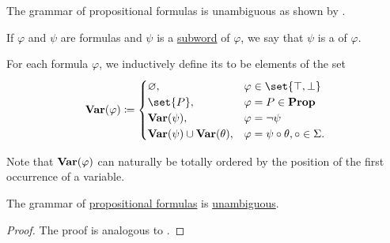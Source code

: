 \begin{definition}
\begin{thmenum}
    The grammar of propositional formulas is unambiguous as shown by .

     If \( \varphi \) and \( \psi \) are formulas and \( \psi \) is a \hyperref[def:language/subword]{subword} of \( \varphi \), we say that \( \psi \) is a  of \( \varphi \).

     For each formula \( \varphi \), we inductively define its  to be elements of the set
    \begin{equation}\label{eq:def:propositional_syntax/varables}
      \boldop{Var}(\varphi) \coloneqq \begin{cases}
        \varnothing,                                  &\varphi \in \set{ \top, \bot } \\
        \set{ P },                                    &\varphi = P \in \boldop{Prop} \\
        \boldop{Var}(\psi),                           &\varphi = \neg \psi \\
        \boldop{Var}(\psi) \cup \boldop{Var}(\theta), &\varphi = \psi \bincirc \theta, \bincirc \in \Sigma.
      \end{cases}
    \end{equation}

    Note that \( \operatorname{\mathbf{Var}}(\varphi) \) can naturally be totally ordered by the position of the first occurrence of a variable.
  \end{thmenum}
\end{definition}

\begin{proposition}\label{thm:propositional_formulas_are_unambiguous}
  The grammar of \hyperref[def:propositional_syntax/formula]{propositional formulas} is \hyperref[def:grammar_derivation/ambiguity]{unambiguous}.
\end{proposition}
\begin{proof}
  The proof is analogous to .
\end{proof}

